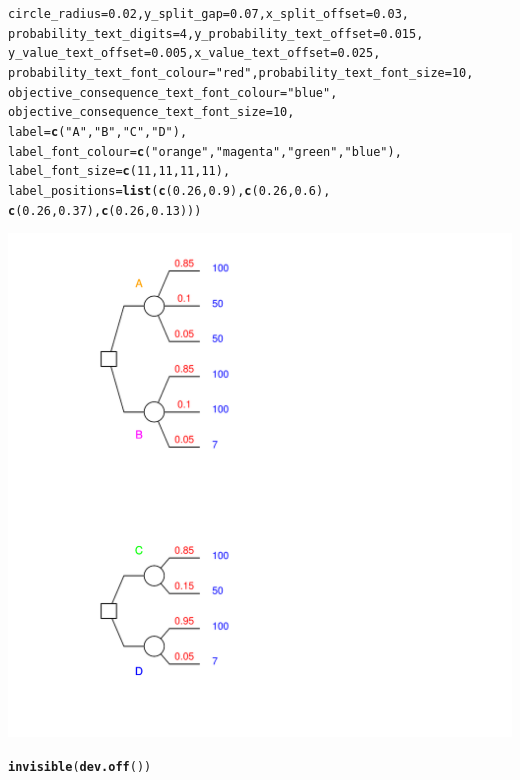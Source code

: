 \documentclass{article}\usepackage[]{graphicx}\usepackage[]{color}
\makeatletter
\newcommand{\hlnum}[1]{\textcolor[rgb]{0.686,0.059,0.569}{#1}}%
\newcommand{\hlstr}[1]{\textcolor[rgb]{0.192,0.494,0.8}{#1}}%
\newcommand{\hlstd}[1]{\textcolor[rgb]{0.345,0.345,0.345}{#1}}%
\newcommand{\hlkwc}[1]{\textcolor[rgb]{0.333,0.667,0.333}{#1}}%
\newcommand{\hlkwd}[1]{\textcolor[rgb]{0.737,0.353,0.396}{\textbf{#1}}}%
\newenvironment{kframe}{%
 \def\at@end@of@kframe{}%
 \ifinner\ifhmode%
  \def\at@end@of@kframe{\end{minipage}}%
  \begin{minipage}{\columnwidth}%
 \fi\fi%
 \def\FrameCommand##1{\hskip\@totalleftmargin \hskip-\fboxsep
 \colorbox{shadecolor}{##1}\hskip-\fboxsep
     \hskip-\linewidth \hskip-\@totalleftmargin \hskip\columnwidth}%
 \MakeFramed {\advance\hsize-\width
   \@totalleftmargin\z@ \linewidth\hsize
   \@setminipage}}%
 {\par\unskip\endMakeFramed%
 \at@end@of@kframe}
\newenvironment{knitrout}{}{} %
\makeatother
\begin{document}
\begin{knitrout}
\begin{kframe}
\begin{alltt}
        \hlkwc{circle_radius}\hlstd{=}\hlnum{0.02}\hlstd{,} \hlkwc{y_split_gap}\hlstd{=}\hlnum{0.07}\hlstd{,} \hlkwc{x_split_offset}\hlstd{=}\hlnum{0.03}\hlstd{,}
        \hlkwc{probability_text_digits}\hlstd{=}\hlnum{4}\hlstd{,} \hlkwc{y_probability_text_offset}\hlstd{=}\hlnum{0.015}\hlstd{,}
        \hlkwc{y_value_text_offset}\hlstd{=}\hlnum{0.005}\hlstd{,} \hlkwc{x_value_text_offset}\hlstd{=}\hlnum{0.025}\hlstd{,}
        \hlkwc{probability_text_font_colour}\hlstd{=}\hlstr{"red"}\hlstd{,} \hlkwc{probability_text_font_size}\hlstd{=}\hlnum{10}\hlstd{,}
        \hlkwc{objective_consequence_text_font_colour}\hlstd{=}\hlstr{"blue"}\hlstd{,}
        \hlkwc{objective_consequence_text_font_size}\hlstd{=}\hlnum{10}\hlstd{,}
        \hlkwc{label}\hlstd{=}\hlkwd{c}\hlstd{(}\hlstr{"A"}\hlstd{,}\hlstr{"B"}\hlstd{,}\hlstr{"C"}\hlstd{,}\hlstr{"D"}\hlstd{),}
        \hlkwc{label_font_colour}\hlstd{=}\hlkwd{c}\hlstd{(}\hlstr{"orange"}\hlstd{,}\hlstr{"magenta"}\hlstd{,}\hlstr{"green"}\hlstd{,}\hlstr{"blue"}\hlstd{),}
        \hlkwc{label_font_size}\hlstd{=}\hlkwd{c}\hlstd{(}\hlnum{11}\hlstd{,}\hlnum{11}\hlstd{,}\hlnum{11}\hlstd{,}\hlnum{11}\hlstd{),}
        \hlkwc{label_positions}\hlstd{=}\hlkwd{list}\hlstd{(}\hlkwd{c}\hlstd{(}\hlnum{0.26}\hlstd{,}\hlnum{0.9}\hlstd{),}\hlkwd{c}\hlstd{(}\hlnum{0.26}\hlstd{,}\hlnum{0.6}\hlstd{),}
                \hlkwd{c}\hlstd{(}\hlnum{0.26}\hlstd{,}\hlnum{0.37}\hlstd{),}\hlkwd{c}\hlstd{(}\hlnum{0.26}\hlstd{,}\hlnum{0.13}\hlstd{)))}
\end{alltt}
\end{kframe}

{\centering \includegraphics[width=0.8\linewidth]{figure/unnamed-chunk-43} 

}


\begin{kframe}\begin{alltt}
\hlkwd{invisible}\hlstd{(}\hlkwd{dev.off}\hlstd{())}
\end{alltt}
\end{kframe}
\end{knitrout}
\end{document}
